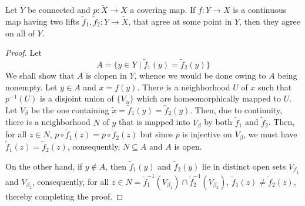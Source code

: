 \begin{theorem}
    Let $Y$ be connected and $p:\widetilde X\to X$ a covering map. If $f: Y\to X$ is a continuous map having two lifts $\widetilde f_1,\widetilde f_2: Y\to\widetilde X$, that agree at some point in $Y$, then they agree on all of $Y$.
\end{theorem}
\begin{proof}
    Let 
    \begin{equation*}
        A = \{y\in Y\mid \widetilde f_1(y) = \widetilde f_2(y)\}
    \end{equation*}
    We shall show that $A$ is clopen in $Y$, whence we would be done owing to $A$ being nonempty. Let $y\in A$ and $x = f(y)$. There is a neighborhood $U$ of $x$ such that $p^{-1}(U)$ is a disjoint union of $\{V_\alpha\}$ which are homeomorphically mapped to $U$. Let $V_\beta$ be the one containing $\widetilde x = \widetilde f_1(y) = \widetilde f_2(y)$. Then, due to continuity, there is a neighborhood $N$ of $y$ that is mapped into $V_\beta$ by both $\widetilde f_1$ and $\widetilde f_2$. Then, for all $z\in N$, $p\circ\widetilde f_1(z) = p\circ\widetilde f_2(z)$ but since $p$ is injective on $V_\beta$, we must have $\widetilde f_1(z) = \widetilde f_2(z)$, consequently, $N\subseteq A$ and $A$ is open.

    On the other hand, if $y\notin A$, then $\widetilde f_1(y)$ and $\widetilde f_2(y)$ lie in distinct open sets $V_{\beta_1}$ and $V_{\beta_2}$, consequently, for all $z\in N = \widetilde f_1^{-1}(V_{\beta_1})\cap\widetilde f_2^{-1}(V_{\beta_2})$, $\widetilde f_1(z)\ne\widetilde f_2(z)$, thereby completing the proof.
\end{proof}

